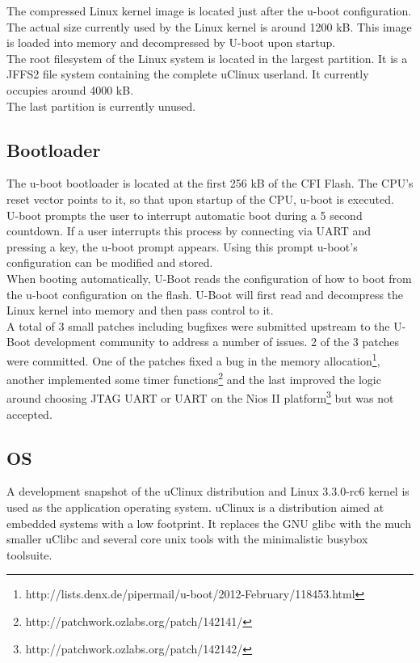 The compressed Linux kernel image is located just after the u-boot configuration. The actual
size currently used by the Linux kernel is around 1200 kB. This image is loaded into memory
and decompressed by U-boot upon startup.
\\

The root filesystem of the Linux system is located in the largest partition. It is a JFFS2
file system containing the complete uClinux userland. It currently occupies around 4000 kB.
\\

The last partition is currently unused.


\newpage
\subsection{Bootloader}
The u-boot bootloader is located at the first 256 kB of the CFI Flash. The CPU's
reset vector points to it, so that upon startup of the CPU, u-boot is executed.
\\

U-boot prompts the user to interrupt automatic boot during a 5 second countdown. If a
user interrupts this process by connecting via UART and pressing a key, the u-boot
prompt appears. Using this prompt u-boot's configuration can be modified and stored.
\\

When booting automatically, U-Boot reads the configuration of how to boot from the
u-boot configuration on the flash. U-Boot will first read and decompress the Linux
kernel into memory and then pass control to it.
\\

A total of 3 small patches including bugfixes were submitted upstream to the U-Boot development
community to address a number of issues. 2 of the 3 patches were committed. One of the patches
fixed a bug in the memory allocation\footnote{http://lists.denx.de/pipermail/u-boot/2012-February/118453.html},
another implemented some timer functions\footnote{http://patchwork.ozlabs.org/patch/142141/} and the last
improved the logic around choosing JTAG UART or UART on the Nios II platform\footnote{http://patchwork.ozlabs.org/patch/142142/} but was not accepted.
\\


\subsection{OS}
A development snapshot of the uClinux distribution and Linux 3.3.0-rc6 kernel is used as the
application operating system. uClinux is a distribution aimed at embedded systems with a low
footprint. It replaces the GNU glibc with the much smaller uClibc and several core unix tools
with the minimalistic busybox toolsuite.
\\

